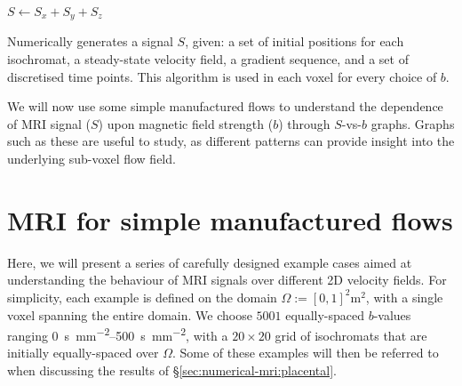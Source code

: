         \begin{algorithm}
            $S \gets S_x + S_y + S_z$ \\
            \caption{Numerically generates a signal $S$, given: a set of initial positions for each isochromat, a steady-state velocity field, a gradient sequence, and a set of discretised time points. This algorithm is used in each voxel for every choice of $b$.}
            \label{alg:mri}
        \end{algorithm}

        We will now use some simple manufactured flows to understand the dependence of MRI signal ($S$) upon magnetic field strength ($b$) through $S$-vs-$b$ graphs. Graphs such as these are useful to study, as different patterns can provide insight into the underlying sub-voxel flow field.

    \section{MRI for simple manufactured flows} \label{sec:numerical-mri:manufactured}
        Here, we will present a series of carefully designed example cases aimed at understanding the behaviour of MRI signals over different 2D velocity fields. For simplicity, each example is defined on the domain $\Omega := [0, 1]^2 \unit{\metre^2}$, with a single voxel spanning the entire domain. We choose $5001$ equally-spaced $b$-values ranging \qtyrange{0}{500}{\second\per\milli\meter^2}, with a $20\times20$ grid of isochromats that are initially equally-spaced over $\Omega$. Some of these examples will then be referred to when discussing the results of \S\ref{sec:numerical-mri:placental}.

